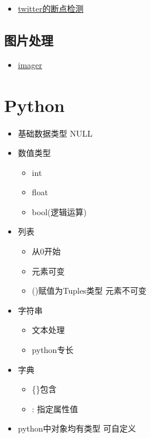 \documentclass[]{book}
\providecommand{\tightlist}{%
  \setlength{\itemsep}{0pt}\setlength{\parskip}{0pt}}
\begin{document}
\begin{itemize}
\tightlist
\item
  \href{https://github.com/twitter/BreakoutDetection}{twitter的断点检测}
\end{itemize}

\hypertarget{ux56feux7247ux5904ux7406}{%
\subsection{图片处理}\label{ux56feux7247ux5904ux7406}}

\begin{itemize}
\tightlist
\item
  \href{https://github.com/dahtah/imager}{imager}
\end{itemize}

\hypertarget{python}{%
\section{Python}\label{python}}

\begin{itemize}
\tightlist
\item
  基础数据类型 NULL
\item
  数值类型

  \begin{itemize}
  \tightlist
  \item
    int
  \item
    float
  \item
    bool(逻辑运算)
  \end{itemize}
\item
  列表

  \begin{itemize}
  \tightlist
  \item
    从0开始
  \item
    元素可变
  \item
    ()赋值为Tuples类型 元素不可变
  \end{itemize}
\item
  字符串

  \begin{itemize}
  \tightlist
  \item
    文本处理
  \item
    python专长
  \end{itemize}
\item
  字典

  \begin{itemize}
  \tightlist
  \item
    \{\}包含
  \item
    : 指定属性值
  \end{itemize}
\item
  python中对象均有类型 可自定义
\end{itemize}
\end{document}
